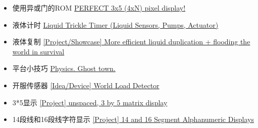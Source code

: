\begin{itemize}
\item 使用异或门的ROM \href{https://forums.terraria.org/index.php?threads/perfect-3x5-4xn-pixel-display.76591/}{PERFECT 3x5 (4xN) pixel display!}
\item 液体计时 \href{https://forums.terraria.org/index.php?threads/liquid-trickle-timer-liquid-sensors-pumps-actuator.76803/}{Liquid Trickle Timer (Liquid Sensors, Pumps, Actuator)}
\item 液体复制 \href{https://forums.terraria.org/index.php?threads/project-showcase-more-efficient-liquid-duplication-flooding-the-world-in-survival.76943/}{[Project/Showcase] More efficient liquid duplication + flooding the world in survival}
\item 平台小技巧 \href{https://forums.terraria.org/index.php?threads/physics-ghost-town.76974/}{Physics. Ghost town.}
\item 开服传感器 \href{https://forums.terraria.org/index.php?threads/idea-device-world-load-detector.76984/}{[Idea/Device] World Load Detector}
\item 3*5显示 \href{https://forums.terraria.org/index.php?threads/project-unspaced-3-by-5-matrix-display.77062/}{[Project] unspaced, 3 by 5 matrix display}
\item 14段线和16段线字符显示 \href{https://forums.terraria.org/index.php?threads/project-14-and-16-segment-alphanumeric-displays.75927/}{[Project] 14 and 16 Segment Alphanumeric Displays}
\end{itemize}

